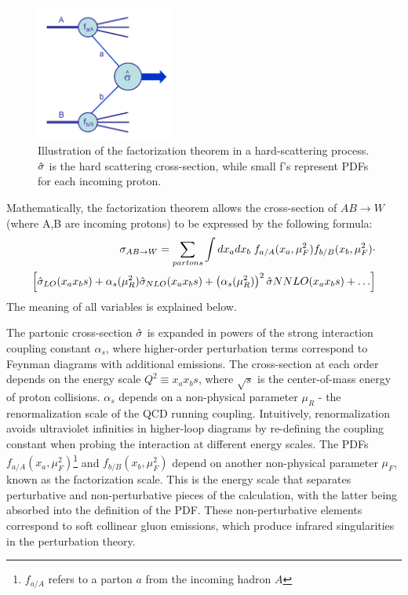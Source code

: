 \begin{figure}[phtb]
  \begin{center}
    \includegraphics[width=0.4\textwidth]{theory/fig/Hardscattering}
    \caption{ Illustration of the factorization theorem in a hard-scattering process. $\hat{\sigma}$ is the hard scattering cross-section, while small f's represent PDFs for each incoming proton. }
    \label{fig:theory:hardscatter}
 \end{center}
\end{figure}

Mathematically, the factorization theorem allows the cross-section of $AB\to W$ (where A,B are incoming protons) to be expressed by the following formula:
\begin{equation}
\begin{split}
\sigma_{AB\to W} = \sum\limits_{partons} \int dx_a dx_b\; f_{a/A}(x_a,\mu_{F}^2) f_{b/B}(x_b,\mu_{F}^2) \cdot \\
\left[ \hat{\sigma}_{LO}(x_{a}x_{b}s) + \alpha_{s}(\mu_{R}^2)\hat{\sigma}_{NLO}(x_{a}x_{b}s) + \left(\alpha_{s}(\mu_{R}^2)\right)^{2}\hat{\sigma}{NNLO}(x_{a}x_{b}s) + \ldots \right]
\end{split}
\label{sigll}
\end{equation}
The meaning of all variables is explained below.

The partonic cross-section $\hat{\sigma}$ is expanded in powers of the strong interaction coupling constant $\alpha_{s}$, where higher-order perturbation terms correspond to Feynman diagrams with additional emissions. The cross-section at each order depends on the energy scale $Q^2 \equiv x_{a}x_{b}s$, where $\sqrt s$ is the center-of-mass energy of proton collisions. $\alpha_{s}$ depends on a non-physical parameter $\mu_{R}$ - the renormalization scale of the QCD running coupling. Intuitively, renormalization avoids ultraviolet infinities in higher-loop diagrams by re-defining the coupling constant when probing the interaction at different energy scales. The PDFs $f_{a/A}(x_a,\mu_{F}^2)$\footnote{$f_{a/A}$ refers to a parton $a$ from the incoming hadron $A$} and $f_{b/B}(x_b,\mu_{F}^2)$ depend on another non-physical parameter $\mu_{F}$, known as the factorization scale. This is the energy scale that separates perturbative and non-perturbative pieces of the calculation, with the latter being absorbed into the definition of the PDF. These non-perturbative elements correspond to soft collinear gluon emissions, which produce infrared singularities in the perturbation theory.

